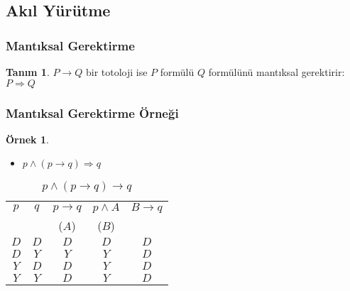 \documentclass[dvipsnames]{beamer}
\theoremstyle{definition}
\newtheorem{tanim}[theorem]{Tanım}
\theoremstyle{example}
\newtheorem{ornek}[theorem]{Örnek}
\theoremstyle{plain}
\begin{document}
\subsection{Akıl Yürütme}

\begin{frame}
  \frametitle{Mantıksal Gerektirme}

  \begin{tanim}
    $P \rightarrow Q$ bir totoloji ise $P$ formülü $Q$ formülünü
    \alert{mantıksal gerektirir}:\\
    $P \Rightarrow Q$
  \end{tanim}
\end{frame}

\begin{frame}
  \frametitle{Mantıksal Gerektirme Örneği}

  \begin{ornek}
    \begin{itemize}
      \item $p \wedge (p \rightarrow q) \Rightarrow q$
    \end{itemize}

    \begin{table}
      \caption{$p \wedge (p \rightarrow q) \rightarrow q$}
      \begin{tabular}{|c|c|c|c||c|}\hline
        $p$ & $q$ & $p \rightarrow q$ & $p \wedge A$ & $B \rightarrow q$\\
            &     & ($A$)             & ($B$)        &\\\hline\hline
        $D$ & $D$ & $D$ & $D$ & $D$\\\hline
        $D$ & $Y$ & $Y$ & $Y$ & $D$\\\hline
        $Y$ & $D$ & $D$ & $Y$ & $D$\\\hline
        $Y$ & $Y$ & $D$ & $Y$ & $D$\\\hline
      \end{tabular}
    \end{table}
  \end{ornek}
\end{frame}
\end{document}
